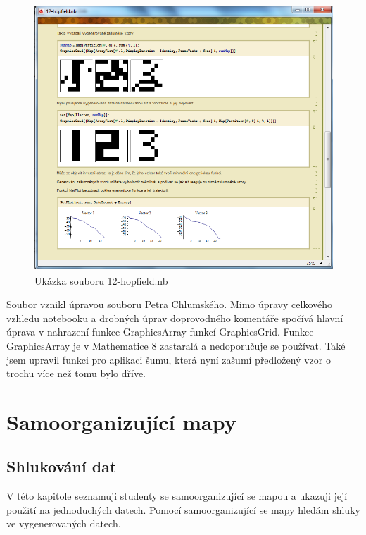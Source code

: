 \documentclass[11pt,twoside,a4paper]{book}
\begin{document}
\begin{figure}[h!]
\begin{center}
\includegraphics[height=10cm]{figures/ukazka12.png}
\caption{Ukázka souboru 12-hopfield.nb}
\label{fig:hopfield}
\end{center}
\end{figure}

Soubor vznikl úpravou souboru Petra Chlumského. Mimo úpravy celkového vzhledu notebooku a drobných úprav doprovodného komentáře spočívá hlavní úprava v nahrazení funkce GraphicsArray funkcí GraphicsGrid. Funkce GraphicsArray je v Mathematice 8 zastaralá a nedoporučuje se používat. Také jsem upravil funkci pro aplikaci šumu, která nyní zašumí předložený vzor o trochu více než tomu bylo dříve.
\newpage
\section{Samoorganizující mapy}
\subsection{Shlukování dat}
V této kapitole seznamuji studenty se samoorganizující se mapou a ukazuji její použití na jednoduchých datech. Pomocí samoorganizující se mapy hledám shluky ve vygenerovaných datech.
\end{document}
